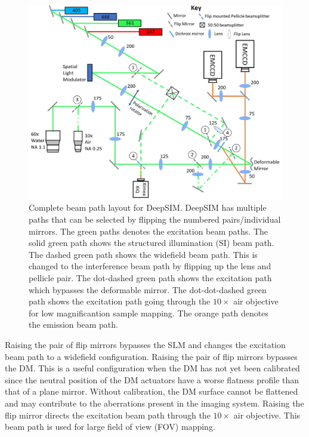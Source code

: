 \begin{figure}[h]
	\centering
	\includegraphics[width=\textwidth]{images/DeepSIM_complete_beam_paths.jpg}
	\caption{Complete beam path layout for DeepSIM. DeepSIM has multiple paths that can be selected by flipping the numbered pairs/individual mirrors. The green paths denotes the excitation beam paths. The solid green path shows the structured illumination (SI) beam path. The dashed green path shows the widefield beam path. This is changed to the interference beam path by flipping up the lens and pellicle pair. The dot-dashed green path shows the excitation path which bypasses the deformable mirror. The dot-dot-dashed green path shows the excitation path going through the $10\times$ air objective for low magnificantion sample mapping. The orange path denotes the emission beam path.}
	\label{fig:DeepSIM_complete_beam_paths}
\end{figure}

Raising the  pair of flip mirrors bypasses the SLM and changes the excitation beam path to a widefield configuration. Raising the  pair of flip mirrors bypasses the DM. This is a useful configuration when the DM has not yet been calibrated since the neutral position of the DM actuators have a worse flatness profile than that of a plane mirror. Without calibration, the DM surface cannot be flattened and may contribute to the aberrations present in the imaging system. Raising the  flip mirror directs the excitation beam path through the $10 \times$ air objective. This beam path is used for large field of view (FOV) mapping.

